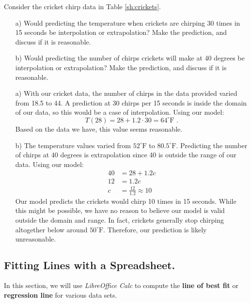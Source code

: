 \begin{example}
  Consider the cricket chirp data in Table \ref{sh:crickets}.
  \begin{itemize}
    \item[a)] Would predicting the temperature when crickets are chirping 30 times in 15 seconds be interpolation or extrapolation? Make the prediction, and discuss if it is reasonable.
    \item[b)] Would predicting the number of chirps crickets will make at 40 degrees be interpolation or extrapolation? Make the prediction, and discuss if it is reasonable.
  \end{itemize}

  \begin{solution}
    \begin{itemize}
        \item[a)] With our cricket data, the number of chirps in the data provided varied from 18.5 to 44. A prediction at 30 chirps per 15 seconds is inside the domain of our data, so this would be a case of interpolation. Using our model:
        $$T(28) = 28 + 1.2\cdot 30 = 64^{\circ}\mbox{F .}$$
        Based on the data we have, this value seems reasonable.

        \item[b)] The temperature values varied from $52^{\circ}\mbox{F}$ to $80.5^{\circ}\mbox{F}$. Predicting the number of chirps at 40 degrees is extrapolation since 40 is outside the range of our data. Using our model:
        \begin{align*}
          40 &= 28 + 1.2c\\
          12 &= 1.2 c\\
          c &= \frac{12}{1.2} \approx 10
        \end{align*}
        Our model predicts the crickets would chirp 10 times in 15 seconds. While this might be possible, we have no reason to believe our model is valid outside the domain and range. In fact, crickets generally stop chirping altogether below around $50^{\circ}\mbox{F}$. Therefore, our prediction is likely unreasonable.
      \end{itemize}
\end{solution}\end{example}


%

\subsection{Fitting Lines with a Spreadsheet.}
In this section, we will use {\em LibreOffice Calc} to compute the {\bf line of best fit} or {\bf regression line} for various data sets.

